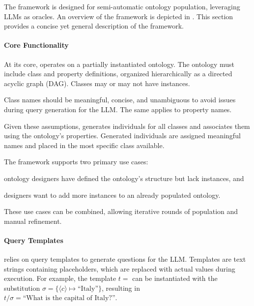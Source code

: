 The \llmfkg{} framework is designed for semi-automatic ontology population, leveraging \glspl{LLM} as oracles.
%
An overview of the \llmfkg{} framework is depicted in .
%
This section provides a concise yet general description of the framework.

%
\paragraph{Core Functionality}
\label{par:core-functionality}

At its core, \llmfkg{} operates on a partially instantiated ontology.
%
The ontology must include class and property definitions, organized hierarchically as a directed acyclic graph (DAG).
%
Classes may or may not have instances.

%
Class names should be meaningful, concise, and unambiguous to avoid issues during query generation for the \gls{LLM}.
%
The same applies to property names.

%
Given these assumptions, \llmfkg{} generates individuals for all classes and associates them using the ontology's properties.
%
Generated individuals are assigned meaningful names and placed in the most specific class available.

%
The framework supports two primary use cases:
%
\begin{inlinelist}
    \item ontology designers have defined the ontology's structure but lack instances, and
    \item designers want to add more instances to an already populated ontology.
\end{inlinelist}
%
These use cases can be combined, allowing iterative rounds of population and manual refinement.

%
\paragraph{Query Templates}
\label{par:query-templates}

\llmfkg{} relies on query templates to generate questions for the \gls{LLM}.
%
Templates are text strings containing placeholders, which are replaced with actual values during execution.
%
For example, the template \(t = \) can be instantiated with the substitution \(\sigma = \{\langle c \rangle \mapsto \text{``Italy''}\}\), resulting in \(t / \sigma = \text{``What is the capital of Italy?''}\).

